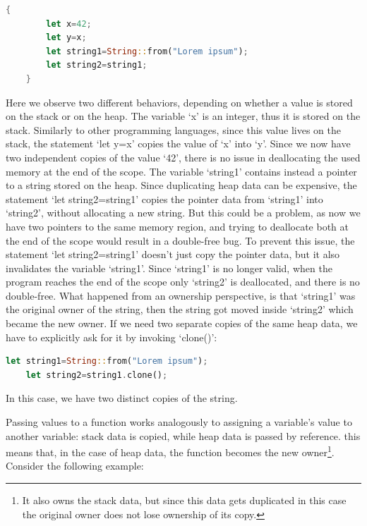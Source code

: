 \documentclass{report}
\begin{document}
\begin{lstlisting}[language=Rust, style=colouredRust]
	{
		let x=42;
		let y=x;
		let string1=String::from("Lorem ipsum");
		let string2=string1;
	}
\end{lstlisting}

Here we observe two different behaviors, depending on whether a value is stored on the stack or on the heap. The variable \enquote*{x} is an integer, thus it is stored on the
stack. Similarly to other programming languages, since this value lives on the stack, the statement \enquote*{let y=x} copies the value of \enquote*{x} into \enquote*{y}. Since we
now have two independent copies of the value \enquote*{42}, there is no issue in deallocating the used memory at the end of the scope. The variable \enquote*{string1} contains instead
a pointer to a string stored on the heap. Since duplicating heap data can be expensive, the statement \enquote*{let string2=string1} copies the pointer data from
\enquote*{string1} into \enquote*{string2}, without allocating a new string. But this could be a problem, as now we have two pointers to the same memory region, and trying to deallocate both at the end of the
scope would result in a double-free bug. To prevent this issue, the statement \enquote*{let string2=string1} doesn't just copy the pointer data, but it also invalidates the
variable \enquote*{string1}. Since \enquote*{string1} is no longer valid, when the program reaches the end of the scope only \enquote*{string2} is deallocated, and there is no
double-free. What happened from an ownership perspective, is that \enquote*{string1} was the original owner of the string, then the string got moved inside \enquote*{string2} which
became the new owner. If we need two separate copies of the same heap data, we have to explicitly ask for it by invoking \enquote*{clone()}:

\begin{lstlisting}[language=Rust, style=colouredRust]
	let string1=String::from("Lorem ipsum");
	let string2=string1.clone();
\end{lstlisting}

In this case, we have two distinct copies of the string. \par
Passing values to a function works analogously to assigning a variable's value to another variable: stack data is copied, while heap data is passed by reference. this means that, in
the case of heap data, the function becomes the new owner\footnote{It also owns the stack data, but since this data gets duplicated in this case the original owner does not lose
ownership of its copy.}. Consider the following example:
\end{document}
